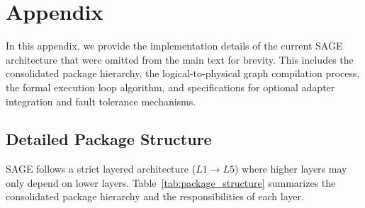 \section{Appendix}
\label{sec:appendix}

In this appendix, we provide the implementation details of the current SAGE architecture that were omitted from the main text for brevity. This includes the consolidated package hierarchy, the logical-to-physical graph compilation process, the formal execution loop algorithm, and specifications for optional adapter integration and fault tolerance mechanisms.

\subsection{Detailed Package Structure}
\label{subsec:app_package}
SAGE follows a strict layered architecture ($L1 \rightarrow L5$) where higher layers may only depend on lower layers. Table~\ref{tab:package_structure} summarizes the consolidated package hierarchy and the responsibilities of each layer.

\begin{table}[h]
\centering
\caption{SAGE Package Structure and Responsibilities}
\label{tab:package_structure}
\end{table}

